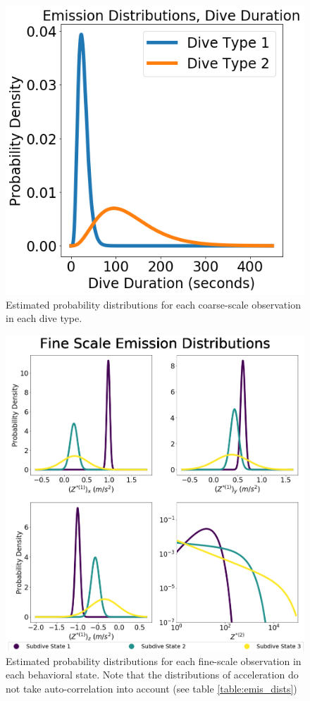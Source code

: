 \begin{figure}[ht]
	\centering
	\includegraphics[width=5in]{../Plots/coarse-emissions.png}
	\caption{Estimated probability distributions for each coarse-scale observation in each dive type.}
	\label{fig:coarse_emis}
\end{figure}

\begin{figure}[ht]
	\centering
	\includegraphics[width=5in]{../Plots/fine-emissions.png}
	\caption{Estimated probability distributions for each fine-scale observation in each behavioral state. Note that the distributions of acceleration do not take auto-correlation into account (see table \ref{table:emis_dists})}
	\label{fig:fine_emis}
\end{figure}

